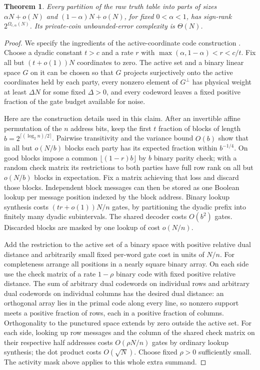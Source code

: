 \documentclass[11pt]{article}
\newtheorem{theorem}{Theorem}
\begin{document}
\begin{theorem}\label{raw}
Every partition of the raw truth table into parts of sizes $\alpha N+o(N)$ and $(1-\alpha)N+o(N)$, for fixed $0<\alpha<1$, has sign-rank $2^{\Omega_{c,\alpha}(N)}$. Its private-coin unbounded-error complexity is $\Theta(N)$.
\end{theorem}
\begin{proof}
We specify the ingredients of the active-coordinate code construction \cite{code}. Choose a dyadic constant $t>c$ and a rate $r$ with $\max(\alpha,1-\alpha)<r<c/t$. Fix all but $(t+o(1))N$ coordinates to zero. The active set and a binary linear space $G$ on it can be chosen so that $G$ projects surjectively onto the active coordinates held by each party, every nonzero element of $G^\perp$ has physical weight at least $\Delta N$ for some fixed $\Delta>0$, and every codeword leaves a fixed positive fraction of the gate budget available for noise.

Here are the construction details used in this claim. After an invertible affine permutation of the $n$ address bits, keep the first $t$ fraction of blocks of length $b=2^{\lceil(\log_2 n)/2\rceil}$. Pairwise transitivity and the variance bound $O(b)$ show that in all but $o(N/b)$ blocks each party has its expected fraction within $b^{-1/4}$. On good blocks impose a common $\lfloor(1-r)b\rfloor$ by $b$ binary parity check; with a random check matrix its restrictions to both parties have full row rank on all but $o(N/b)$ blocks in expectation. Fix a matrix achieving that loss and discard those blocks. Independent block messages can then be stored as one Boolean lookup per message position indexed by the block address. Binary lookup synthesis costs $(tr+o(1))N/n$ gates, by partitioning the dyadic prefix into finitely many dyadic subintervals. The shared decoder costs $O(b^2)$ gates. Discarded blocks are masked by one lookup of cost $o(N/n)$.

Add the restriction to the active set of a binary space with positive relative dual distance and arbitrarily small fixed per-word gate cost in units of $N/n$. For completeness arrange all positions in a nearly square binary array. On each side use the check matrix of a rate $1-\rho$ binary code with fixed positive relative distance. The sum of arbitrary dual codewords on individual rows and arbitrary dual codewords on individual columns has the desired dual distance: an orthogonal array lies in the primal code along every line, so nonzero support meets a positive fraction of rows, each in a positive fraction of columns. Orthogonality to the punctured space extends by zero outside the active set. For each side, looking up row messages and the column of the shared check matrix on their respective half addresses costs $O(\rho N/n)$ gates by ordinary lookup synthesis; the dot product costs $O(\sqrt N)$. Choose fixed $\rho>0$ sufficiently small. The activity mask above applies to this whole extra summand.


\end{proof}
\end{document}
